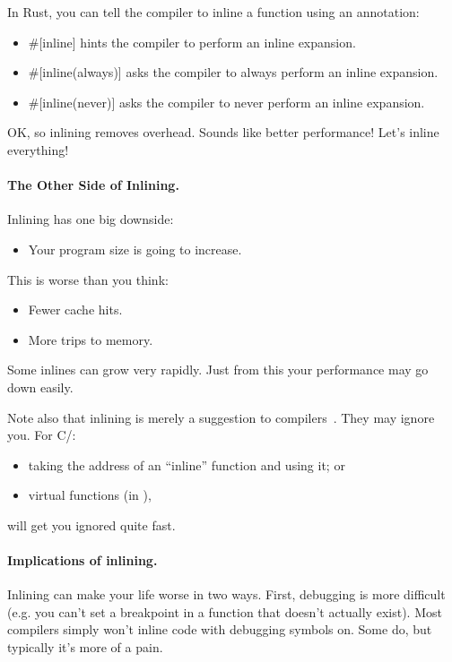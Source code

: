 In Rust, you can tell the compiler to inline a function using an annotation:
\begin{itemize}[noitemsep]
 \item \#[inline] hints the compiler to perform an inline expansion.
 \item \#[inline(always)] asks the compiler to always perform an inline expansion.
 \item \#[inline(never)] asks the compiler to never perform an inline expansion.
\end{itemize}

OK, so inlining removes overhead. Sounds like better performance! Let's inline everything!


\paragraph{The Other Side of Inlining.}
Inlining has one big downside:
  \begin{itemize}
    \item Your program size is going to increase.
  \end{itemize}
   This is worse than you think:
      \begin{itemize}[noitemsep]
        \item Fewer cache hits.
        \item More trips to memory.
      \end{itemize}
   Some inlines can grow very rapidly.
  Just from this your performance may go down easily.

  Note also that inlining is merely a suggestion to compilers~\cite{gcc:inlining}.
  They may ignore you.
  For C/\CPP:
  \begin{itemize}[noitemsep]
    \item taking the address of an ``inline'' function and using it; or
    \item virtual functions (in \CPP),
  \end{itemize}
  will get you ignored quite fast.

\paragraph{Implications of inlining.} Inlining can make your life worse in two ways.
First, debugging is more difficult (e.g. you can't set a breakpoint in a function that
  doesn't actually exist).
 Most compilers simply won't inline code with debugging symbols on.
 Some do, but typically it's more of a pain.

